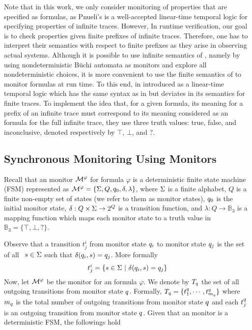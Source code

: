 Note that in this work, we only consider monitoring of properties that are 
specified as \LTL formulas, as Pnueli’s \LTL \cite{p77} is a well-accepted 
linear-time temporal logic for specifying properties of infinite traces. 
However, In runtime verification, our goal is to check \LTL properties given 
finite prefixes of infinite traces. Therefore, one has to interpret their 
semantics with respect to finite prefixes as they arise in observing actual 
systems. Although it is possible to use infinite semantics of \LTL, namely by 
using nondeterministic B\"uchi automata as monitors and explore all 
nondeterministic choices, it is more convenient to use the finite semantics of 
\LTL to monitor \LTL formulas at run time. To this end, in \cite{bls11} 
introduced \LTLtri as a linear-time temporal logic which has the same syntax as 
in \LTL but deviates in its semantics for finite traces. To implement the idea 
that, for a given \LTLtri formula, its meaning for a prefix of an infinite trace 
must correspond to its meaning considered as an \LTL formula for the full 
infinite trace, they use three truth values: true, false, and inconclusive, 
denoted respectively by $\top$, $\bot$, and $?$.



\subsection{Synchronous Monitoring Using \LTLtri Monitors}
\label{sec:SAMltl3}

Recall that an \LTLtri monitor $\mathcal{M}^\varphi$ for \LTL formula $\varphi$ is 
a deterministic finite state machine (FSM) represented as $\mathcal{M}^\varphi = 
\{ \Sigma, Q, q_0, \delta , \lambda \}$, where $\Sigma$ 
is a finite alphabet, $Q$ is a finite non-empty set of states (we refer to them 
as monitor states), $q_0$ is the initial monitor state, $\delta: Q 
\times \Sigma \rightarrow 2^Q $ is a transition function, and $\lambda : Q 
\rightarrow \mathbb{B}_3 $ is a mapping function which maps each monitor state 
to a truth value in $\mathbb{B}_3=\{\top,\bot, ?\}$.

Observe that a transition $t_j^i$ from monitor state $q_i$ to monitor 
state $q_j$ is the set of all \events~$s \in \Sigma $ such that 
$\delta (q_i, s) = q_j$. More formally
$$ t_j^i = \{ s \in \Sigma ~ | ~ \delta (q_i, s) = 
q_j\}$$
Now, let $\mathcal{M}^\varphi$ be the \LTLtri monitor for an \LTL 
formula $\varphi$. We denote by $T_q$ the set of all outgoing 
transitions from monitor state $q$.  Formally, $T_q =\{ 
t_1^q, \cdots , t_{m_q}^q\}$ where $m_q$ is the 
total number of outgoing transitions from monitor state $q$ and each 
$t_j^q$ is an outgoing transition from monitor state $q$. Given 
that an \LTLtri monitor is a deterministic FSM, the followings hold 

